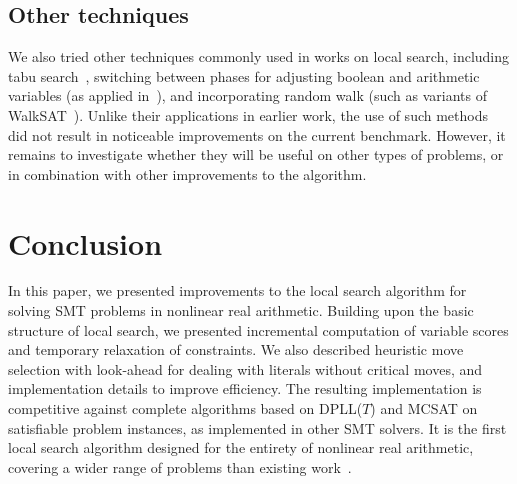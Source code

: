 \documentclass[runningheads]{llncs}
\begin{document}
\subsection{Other techniques}

We also tried other techniques commonly used in works on local search, including tabu search~\cite{DBLP:books/daglib/0093574}, switching between phases for adjusting boolean and arithmetic variables (as applied in~\cite{CaiLZ22}), and incorporating random walk (such as variants of WalkSAT~\cite{HoosS00}). Unlike their applications in earlier work, the use of such methods did not result in noticeable improvements on the current benchmark. However, it remains to investigate whether they will be useful on other types of problems, or in combination with other improvements to the algorithm.

\section{Conclusion}
\label{sec:conclusion}

In this paper, we presented improvements to the local search algorithm for solving SMT problems in nonlinear real arithmetic. Building upon the basic structure of local search, we presented incremental computation of variable scores and temporary relaxation of constraints. We also described heuristic move selection with look-ahead for dealing with literals without critical moves, and implementation details to improve efficiency. The resulting implementation is competitive against complete algorithms based on DPLL($T$) and MCSAT on satisfiable problem instances, as implemented in other SMT solvers. It is the first local search algorithm designed for the entirety of nonlinear real arithmetic, covering a wider range of problems than existing work~\cite{abs-2303-06676,LiXZ23}.
\end{document}
